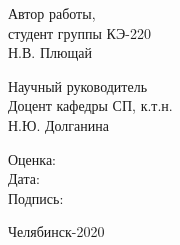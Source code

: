 \begin{titlepage}
\begin{center}
    \end{center}
    \vfill

    \hfill
    \begin{minipage}{0.4\textwidth}
        Автор работы,\\
        студент группы КЭ-220\\
        Н.В. Плющай\\
    \end{minipage}
    \bigskip
    \vfill

    \hfill
    \begin{minipage}{0.4\textwidth}
        Научный руководитель\\
        Доцент кафедры СП, к.т.н.\\
        Н.Ю. Долганина
        
        \noindent
        \newline
        
        Оценка: \underline{\hspace{2cm}}\\
        Дата: \underline{\hspace{2cm}}\\
        Подпись: \underline{\hspace{2cm}}
    \end{minipage}
    \bigskip
    \vfill


    \begin{center}
        Челябинск-2020
    \end{center}
\end{titlepage}
